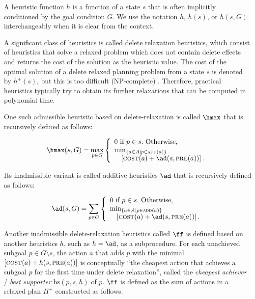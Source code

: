 A heuristic function $h$ is a function of a state $s$ that is often implicitly conditioned by the goal condition $G$.
We use the notation $h$, $h(s)$, or $h(s,G)$ interchangeably when it is clear from the context.

A significant class of heuristics is called delete relaxation heuristics,
which consist of heuristics that solve a relaxed problem which does not contain delete effects
and returns the cost of the solution as the heuristic value.
The cost of the optimal solution of a delete relaxed planning problem from a state $s$ is
denoted by $h^+(s)$, but this is too difficult (NP-complete) \cite{bylander1996}.
Therefore, practical heuristics typically try to obtain its further relaxations
that can be computed in polynomial time.

One such admissible heuristic based on delete-relaxation is called
$\hmax$ \cite{bonet2001planning} that is recursively defined as follows:

\begin{align}
 \hmax(s,G) = \max_{p\in G}
 \left\{
  \begin{array}{l}
   0\ \text{if}\ p\in s.\ \text{Otherwise,}\\
   \min_{\braces{a\in A\mid p\in\adde(a)}} \\
    \quad \left[\cost(a)+\ad(s, \pre(a))\right].
  \end{array}
 \right.
\end{align}

Its inadmissible variant is called
additive heuristics $\ad$ \cite{bonet2001planning} that is recursively defined as follows:

\begin{align}
 \ad(s,G) = \sum_{p\in G}
 \left\{
  \begin{array}{l}
   0\ \text{if}\ p\in s.\ \text{Otherwise,}\\
   \min_{\braces{a\in A\mid p\in\adde(a)}} \\
    \quad \left[\cost(a)+\ad(s, \pre(a))\right].
  \end{array}
 \right.
\end{align}

Another inadmissible delete-relaxation heuristics called
$\ff$ \cite{hoffmann01} is defined based on another heuristics $h$, such as $h=\ad$, as a subprocedure.
For each unachieved subgoal $p\in G\setminus s$,
the action $a$ that adds $p$ with the minimal $\left[\textsc{cost}(a)+h(s, \textsc{pre}(a))\right]$
is conceptually ``the cheapest action that achieves a subgoal $p$ for the first time under delete relaxation'',
called the \emph{cheapest achiever} / \emph{best supporter} $\text{bs}(p,s,h)$ of $p$.
$\ff$ is defined as the sum of actions in a relaxed plan $\Pi^+$ constructed as follows:

